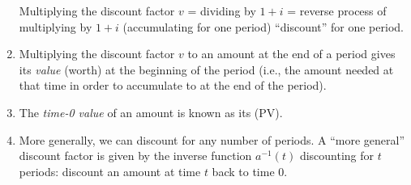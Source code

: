 \begin{enumerate}
\begin{note}
Multiplying the discount factor \(v\) = dividing by \(1+i\) = reverse process
of multiplying by \(1+i\) (accumulating for one period)
 ``discount'' for one period.
\end{note}
\item Multiplying the discount factor \(v\) to an amount 
at the end of a period gives its \emph{value} (worth) at the beginning of the
period (i.e., the amount needed at that time in order to accumulate to
 at the end of the period).
\begin{center}
\end{center}
\item The \emph{time-0 value} of an amount  is known as its
 (PV).
\item More generally, we can discount for any number of periods. A ``more
general'' discount factor is given by the inverse function \(a^{-1}(t)\)
 discounting for \(t\) periods: discount an amount
 at time \(t\) back to time 0.


\end{enumerate}
